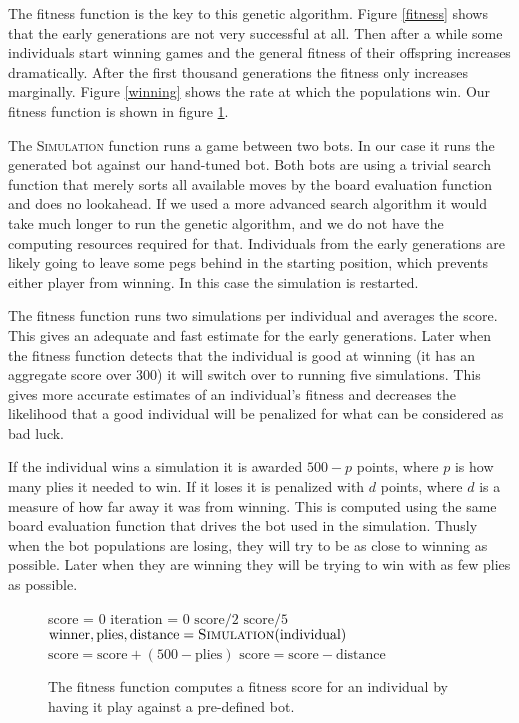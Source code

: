 \documentclass[a4paper,11pt]{article}
\begin{document}
The fitness function is the key to this genetic algorithm. Figure
\ref{fitness} shows that the early generations are not very successful
at all. Then after a while some individuals start winning games and
the general fitness of their offspring increases dramatically. After
the first thousand generations the fitness only increases marginally.
Figure \ref{winning} shows the rate at which the populations win. Our
fitness function is shown in figure \ref{fitnessfn}.

The \textsc{Simulation} function runs a game between two bots. In our
case it runs the generated bot against our hand-tuned bot. Both bots
are using a trivial search function that merely sorts all available
moves by the board evaluation function and does no lookahead. If we
used a more advanced search algorithm it would take much longer to run
the genetic algorithm, and we do not have the computing resources
required for that. Individuals from the early generations are likely
going to leave some pegs behind in the starting position, which
prevents either player from winning. In this case the simulation is
restarted.

The fitness function runs two simulations per individual and averages
the score. This gives an adequate and fast estimate for the early
generations. Later when the fitness function detects that the
individual is good at winning (it has an aggregate score over $300$)
it will switch over to running five simulations. This gives more
accurate estimates of an individual's fitness and decreases the
likelihood that a good individual will be penalized for what can be
considered as bad luck.

If the individual wins a simulation it is awarded $500-p$ points,
where $p$ is how many plies it needed to win. If it loses it is
penalized with $d$ points, where $d$ is a measure of how far away it
was from winning. This is computed using the same board evaluation
function that drives the bot used in the simulation. Thusly when the
bot populations are losing, they will try to be as close to winning as
possible. Later when they are winning they will be trying to win with
as few plies as possible.

\begin{figure}
\begin{algorithmic}
\State score = 0
\State iteration = 0
\While{$\top$}
   \State \Return $\textrm{score} / 2$
   \State \Return $\textrm{score} / 5$
 \EndIf
 \State $\textrm{winner}, \textrm{plies}, \textrm{distance} = \textsc{Simulation}(\textrm{individual})$
   \State $\textrm{score} = \textrm{score} + (500 - \textrm{plies})$
 \Else
   \State $\textrm{score} = \textrm{score} - \textrm{distance}$
 \EndIf
\EndWhile
\EndFunction
\end{algorithmic}
\caption{The fitness function computes a fitness score for an
  individual by having it play against a pre-defined bot.}
\label{fitnessfn}
\end{figure}
\end{document}
